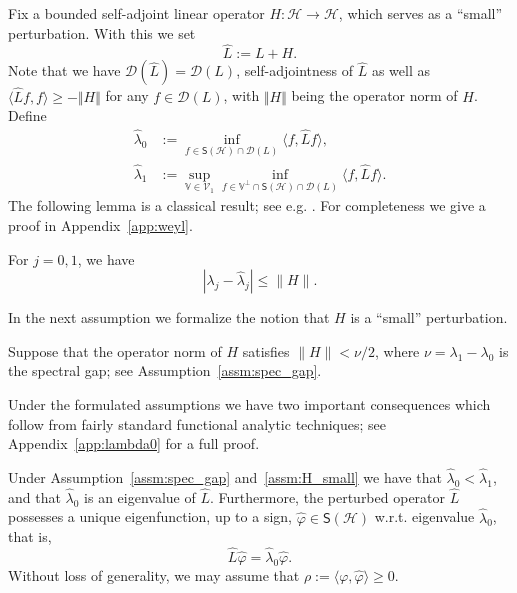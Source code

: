 \documentclass{aptpub}
\newcommand{\Dom}{\mathcal D}
\renewcommand{\H}{\mathcal H}
\begin{document}
Fix a bounded self-adjoint linear operator $H\colon \mathcal{H} \to \mathcal{H}$, which serves as a ``small'' perturbation. With this we set
$$\widehat L := L+H.$$ Note that we have $\Dom(\widehat L) = \Dom(L)$,  
self-adjointness of $\widehat{L}$ as well as
$\langle \widehat L f, f\rangle \geq -\Vert H \Vert$ for any $f\in \Dom(L)$, with $\Vert H \Vert$ being the operator norm of $H$.
Define
\begin{equation}
    \begin{split}
        \widehat \lambda_0 &:=  \inf_{f\in \mathsf S(\H)\cap \Dom(L)} \langle f,\widehat Lf\rangle,\\
        \widehat\lambda_1 &:= \sup_{\mathbb V \in \mathcal V_1} \inf_{f\in \mathbb V^\perp \cap \mathsf S(\H)\cap \Dom(L)} \langle f, \widehat Lf\rangle.
    \end{split}
    \label{eq:def_hatlambda}
\end{equation}
The following lemma is a classical result; see e.g. \cite[Section~XIII.15]{Reed1978}. For completeness we give a proof in Appendix~\ref{app:weyl}.
\begin{lemma}
	\label{lemma:wey}
    For $j=0,1$, we have 
    \begin{equation}
        |\lambda_j - \widehat \lambda_j|\le \|H\|.
        \label{eq:eval_bd}
    \end{equation}
\end{lemma}

In the next assumption we formalize the notion that $H$ is a ``small'' perturbation.
\begin{assumption}
    Suppose that the operator norm of $ H$ satisfies $\|H\|<\nu/2$, where $\nu = \lambda_1-\lambda_0$ is the spectral gap; see Assumption~\ref{assm:spec_gap}.
    \label{assm:H_small}
\end{assumption}
Under the formulated assumptions we have two important consequences which follow from fairly standard functional analytic techniques; see  Appendix~\ref{app:lambda0} for a full proof.
\begin{lemma} \label{lem:conseq_Weyl_Ass2}
	Under Assumption~\ref{assm:spec_gap} and~\ref{assm:H_small} we have that
	$\widehat{\lambda}_0 <  \widehat{\lambda}_1$, and that $\widehat \lambda_0$ is an eigenvalue of $\widehat{L}$. Furthermore,  the perturbed operator $\widehat L$ possesses a unique  eigenfunction, up to a sign, $\widehat \varphi \in \mathsf S(\H)$ w.r.t. eigenvalue $\widehat{\lambda}_0$, that is, 
    \begin{equation*}
        \widehat L\widehat \varphi
        = \widehat \lambda_0\widehat \varphi.
    \end{equation*}
	Without loss of generality, we may assume that $\rho := \langle \varphi, \widehat \varphi\rangle \ge 0$. 
\end{lemma}
\end{document}
